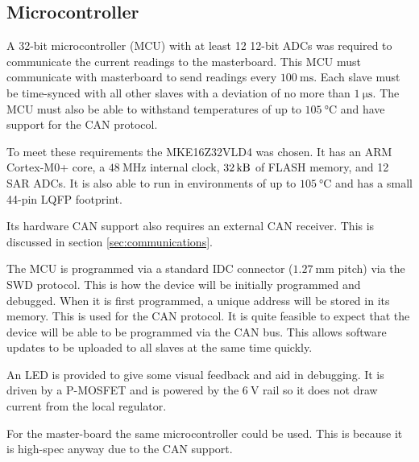 \subsection{Microcontroller}
\label{sec:microcontroller}

A 32-bit microcontroller (MCU) with at least 12 12-bit ADCs was required to communicate the current readings to the masterboard.
This MCU must communicate with masterboard to send readings every $\SI{100}{\milli\second}$.
Each slave must be time-synced with all other slaves with a deviation of no more than $\SI{1}{\micro\second}$.
The MCU must also be able to withstand temperatures of up to $\SI{105}{\degreeCelsius}$ and have support for the CAN protocol.

To meet these requirements the MKE16Z32VLD4 was chosen.
It has an ARM Cortex-M0+ core, a $\SI{48}{\mega\hertz}$ internal clock, $\SI{32}{\kilo\byte}$ of FLASH memory, and 12 SAR ADCs.
It is also able to run in environments of up to $\SI{105}{\degreeCelsius}$ and has a small 44-pin LQFP footprint.

Its hardware CAN support also requires an external CAN receiver.
This is discussed in section \ref{sec:communications}.

The MCU is programmed via a standard IDC connector ($\SI{1.27}{\milli\metre}$ pitch) via the SWD protocol.
This is how the device will be initially programmed and debugged.
When it is first programmed, a unique address will be stored in its memory. This is used for the CAN protocol.
It is quite feasible to expect that the device will be able to be programmed via the CAN bus.
This allows software updates to be uploaded to all slaves at the same time quickly.

An LED is provided to give some visual feedback and aid in debugging.
It is driven by a P-MOSFET and is powered by the $\SI{6}{\volt}$ rail so it does not draw current from the local regulator.

For the master-board the same microcontroller could be used.
This is because it is high-spec anyway due to the CAN support.
